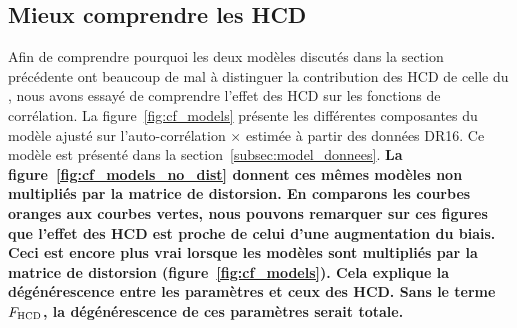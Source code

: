 \documentclass[11pt, twoside, a4paper, openright]{report}
\begin{document}
\subsection{Mieux comprendre les HCD}

Afin de comprendre pourquoi les deux modèles discutés dans la section précédente ont beaucoup de mal à distinguer la contribution des HCD de celle du \lya{}, nous avons essayé de comprendre l'effet des HCD sur les fonctions de corrélation.
La figure~\ref{fig:cf_models} présente les différentes composantes du modèle ajusté sur l'auto-corrélation \lya{}$\times$\lya{} estimée à partir des données DR16. Ce modèle est présenté dans la section~\ref{subsec:model_donnees}.
\textbf{La figure~\ref{fig:cf_models_no_dist} donnent ces mêmes modèles non multipliés par la matrice de distorsion.
En comparons les courbes oranges aux courbes vertes, nous pouvons remarquer sur ces figures que l'effet des HCD est proche de celui d'une augmentation du biais.
Ceci est encore plus vrai lorsque les modèles sont multipliés par la matrice de distorsion (figure~\ref{fig:cf_models}).
Cela explique la dégénérescence entre les paramètres \lya{} et ceux des HCD. Sans le terme $F_{\textsc{HCD}}$, la dégénérescence de ces paramètres serait totale.}
\end{document}
